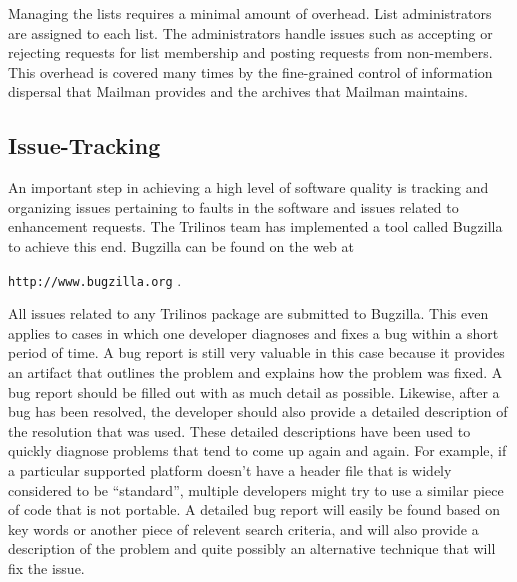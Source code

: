 \documentclass[12pt,relax]{article}
\newcommand{\InlineDirectory}[1]{
  {\hspace{0.01 in}} {\tt #1} {\hspace{0.01 in}}}
\begin{document}
Managing the lists requires a minimal amount of overhead.  List administrators
are assigned to each list.  The administrators handle issues such as accepting
or rejecting requests for list membership and posting requests from 
non-members.  This overhead is covered many times by the fine-grained control
of information dispersal that Mailman provides and the archives that 
Mailman maintains.

\subsection{Issue-Tracking}

An important step in achieving a high level of software quality is tracking
and organizing issues pertaining to faults in the software and issues related 
to enhancement requests.  The Trilinos team has implemented a tool called 
Bugzilla~\cite{Bugzilla} to achieve this end.  Bugzilla  can be found 
on the web at \newline
\InlineDirectory{http://www.bugzilla.org}.

All issues related to any Trilinos package are submitted to Bugzilla.  This 
even applies to cases in which 
one developer diagnoses and fixes a bug within a short period of time.  A bug 
report is still very valuable in this case because it provides an artifact 
that outlines the problem and explains how the problem was fixed.  A bug 
report should be filled out with as much detail as possible.  Likewise, after 
a bug has been resolved, the developer should also provide a detailed 
description of the resolution that was used.  These detailed descriptions have 
been used to quickly diagnose problems that tend to come up again and again.
For example, if a particular supported platform doesn't have a header file 
that is widely considered to be ``standard'', multiple developers might try 
to use a similar piece of code that is not portable.  A detailed bug report 
will easily be found based on key words or another piece of relevent search 
criteria, and will also provide a description of the problem and quite 
possibly an alternative technique that will fix the issue. 
\end{document}
